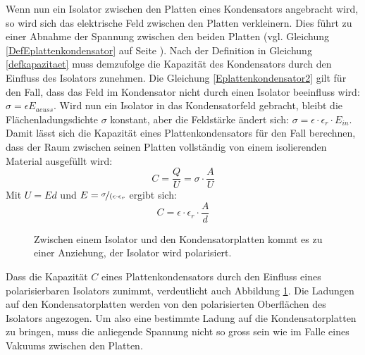 \documentclass[11pt,twoside=false,open=any]{scrbook}
\begin{document}
Wenn nun ein Isolator zwischen den Platten eines Kondensators angebracht wird, so wird sich das elektrische Feld zwischen den Platten verkleinern. Dies führt zu einer Abnahme der Spannung zwischen den beiden Platten (vgl. Gleichung \ref{DefEplattenkondensator} auf Seite \pageref{DefEplattenkondensator}). Nach der Definition in Gleichung \ref{defkapazitaet} muss demzufolge die Kapazität des Kondensators durch den Einfluss des Isolators zunehmen. Die Gleichung \ref{Eplattenkondensator2} gilt für den Fall, dass das Feld im Kondensator nicht durch einen Isolator beeinfluss wird: $\sigma = \epsilon E_{aeuss}$. Wird nun ein Isolator in das Kondensatorfeld gebracht, bleibt die Flächenladungsdichte $\sigma$ konstant, aber die Feldstärke ändert sich: $\sigma = \epsilon \cdot \epsilon_{r} \cdot E_{in}$. Damit lässt sich die Kapazität eines Plattenkondensators für den Fall berechnen, dass der Raum zwischen seinen Platten vollständig von einem isolierenden Material ausgefüllt wird:
\begin{equation}
C = \frac{Q}{U} = \sigma \cdot \frac{A}{U}
\label{kapazitaetisolator}
\end{equation}
Mit $U = E d$ und $E = \nicefrac{\sigma}{(\epsilon \cdot \epsilon_{r}}$ ergibt sich:
\begin{equation}
C = \epsilon \cdot \epsilon_{r} \cdot \frac{A}{d}
\label{kapazitaetisolator2}
\end{equation}

\begin{figure}[h]
\begin{center}
\caption{Zwischen einem Isolator und den Kondensatorplatten kommt es zu einer Anziehung, der Isolator wird polarisiert.}
\label{Isolator}
\end{center}
\end{figure}
Dass die Kapazität $C$ eines Plattenkondensators durch den Einfluss eines polarisierbaren Isolators zunimmt, verdeutlicht auch Abbildung \ref{Isolator}. Die Ladungen auf den Kondensatorplatten werden von den polarisierten Oberflächen des Isolators angezogen. Um also eine bestimmte Ladung auf die Kondensatorplatten zu bringen, muss die anliegende Spannung nicht so gross sein wie im Falle eines Vakuums zwischen den Platten. 
\end{document}
